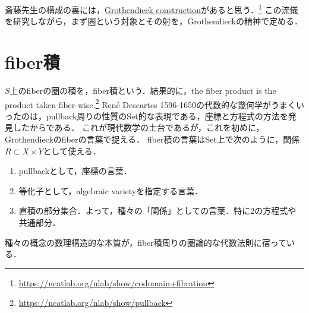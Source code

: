 \documentclass[uplatex,dvipdfmx]{jsreport}
\begin{document}
\begin{tcolorbox}[colframe=ForestGreen, colback=ForestGreen!10!white, breakable ,colbacktitle=ForestGreen!40!white, coltitle=black,fonttitle=\bfseries\sffamily,
    title=Grothendieck construction]
    斎藤先生の構成の裏には，\href{https://ncatlab.org/nlab/show/Grothendieck+construction}{Grothendieck construction}があると思う．\footnote{\url{https://ncatlab.org/nlab/show/codomain+fibration}}
    この流儀を研究しながら，まず圏という対象とその射を，Grothendieckの精神で定める．
\end{tcolorbox}

\section{fiber積}

\begin{tcolorbox}[colframe=ForestGreen, colback=ForestGreen!10!white, breakable ,colbacktitle=ForestGreen!40!white, coltitle=black,fonttitle=\bfseries\sffamily,
    title=fiber積とは，「関係」の概念の圏論化である]
    $S$上のfiberの圏の積を，fiber積という．結果的に，the fiber product is the product taken fiber-wise.\footnote{\url{https://ncatlab.org/nlab/show/pullback}}
    René Descartes 1596-1650の代数的な幾何学がうまくいったのは，pullback周りの性質のSet的な表現である，座標と方程式の方法を発見したからである．
    これが現代数学の土台であるが，これを初めに，Grothendieckのfiberの言葉で捉える．
    fiber積の言葉はSet上で次のように，関係$R\subset X\times Y$として使える．
    \begin{enumerate}
        \item pullbackとして，座標の言葉．
        \item 等化子として，algebraic varietyを指定する言葉．
        \item 直積の部分集合．よって，種々の「関係」としての言葉．特に2の方程式や共通部分．
    \end{enumerate}
    種々の概念の数理構造的な本質が，fiber積周りの圏論的な代数法則に宿っている．
\end{tcolorbox}
\end{document}
